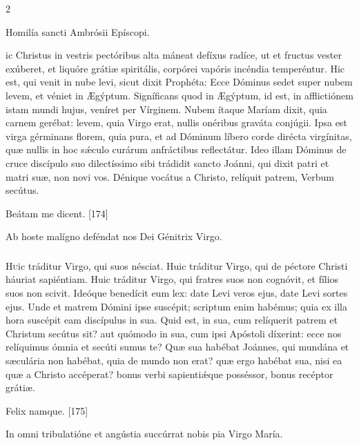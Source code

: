 \documentclass[9pt,twoside]{extarticle}
\begin{document}
\begin{multicols}{2}
\begin{center}Homilía sancti Ambrósii Epíscopi.\\
\end{center}
ic Christus in vestris pectóribus alta máneat defíxus radíce, ut et fructus vester exúberet, et liquóre grátiæ spiritális, corpórei vapóris incéndia temperéntur. Hic est, qui venit in nube levi, sicut dixit Prophéta: Ecce Dóminus sedet super nubem levem, et véniet in Ægýptum. Signíficans quod in Ægýptum, id est, in afflictiónem istam mundi hujus, veníret per Vírginem. Nubem ítaque Maríam dixit, quia carnem gerébat: levem, quia Virgo erat, nullis onéribus graváta conjúgii. Ipsa est virga gérminans florem, quia pura, et ad Dóminum líbero corde dirécta virgínitas, quæ nullis in hoc sǽculo curárum anfráctibus reflectátur. Ideo illam Dóminus de cruce discípulo suo dilectíssimo sibi trádidit sancto Joánni, qui dixit patri et matri suæ, non novi vos. Dénique vocátus a Christo, relíquit patrem, Verbum secútus.

\begin{tightlist}{}
\item {} Beátam me dicent. [174]
\item {\small {} Ab hoste malígno deféndat nos Dei Génitrix Virgo.}
\end{tightlist}

\subsubsection*{\center {}}
\lettrine{H}uic tráditur Virgo, qui suos nésciat. Huic tráditur Virgo, qui de péctore Christi háuriat sapiéntiam. Huic tráditur Virgo, qui fratres suos non cognóvit, et fílios suos non scivit. Ideóque benedícit eum lex: date Levi veros ejus, date Levi sortes ejus. Unde et matrem Dómini ipse suscépit; scriptum enim habémus; quia ex illa hora suscépit eam discípulus in sua. Quid est, in sua, cum relíquerit patrem et Christum secútus sit? aut quómodo in sua, cum ipsi Apóstoli díxerint: ecce nos relíquimus ómnia et secúti sumus te? Quæ sua habébat Joánnes, qui mundána et sæculária non habébat, quia de mundo non erat? quæ ergo habébat sua, nisi ea quæ a Christo accéperat? bonus verbi sapientiǽque posséssor, bonus recéptor grátiæ.

\begin{tightlist}{}
\item {} Felix namque. [175]
\item {\small {} In omni tribulatióne et angústia succúrrat nobis pia Virgo María.}
\end{tightlist}


\end{multicols}
\end{document}
